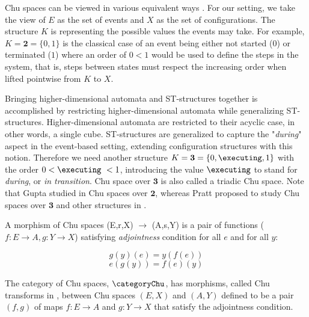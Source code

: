     Chu spaces can be viewed in various equivalent ways \cite[Chapter 5]{gupta94phd_Chu}.  For our setting, we take the view of $E$ as the set of events and $X$ as the set of configurations. The structure $K$ is representing the possible values the events may take. For example, $K= \mathbf{2}= \{0,1\}$ is the classical case of an event being either not started ($0$) or terminated ($1$) where an order of $0 < 1$ would be used to define the steps in the system, that is, steps between states must respect the increasing order when lifted pointwise from $K$ to $X$.
    
    Bringing higher-dimensional automata and ST-structures together is accomplished by restricting higher-dimensional automata while generalizing ST-structures. Higher-dimensional automata are restricted to their acyclic case, in other words, a single cube. ST-structures are generalized to capture the "\emph{during}" aspect in the event-based setting, extending configuration structures with this notion. Therefore we need another structure $K= \mathbf{3}= \{0, \executing , 1\}$ with the order $0 < \executing\ < 1$, introducing the value $\executing$ to stand for \textit{during}, or \textit{in transition}. Chu space over $\mathbf{3}$ is also called a triadic Chu space. Note that Gupta studied in \cite{gupta94phd_Chu} Chu spaces over $\mathbf{2}$, whereas Pratt proposed to study Chu spaces over $\mathbf{3}$ and other structures in \cite{Pratt03trans_cancel}.

    \begin{definition}
        \label{def:morphism_of_Chu_spaces}
        A morphism of Chu spaces (E,r,X) $\rightarrow$ (A,s,Y) is a pair of functions ($f:E \rightarrow A, g:Y \rightarrow X$) satisfying \emph{adjointness} condition for all $e$ and for all $y$:
        
        \begin{equation}
            g(y)(e) = y(f(e))\label{categoryChu1}
        \end{equation} 
        \begin{equation}
            e(g(y)) = f(e)(y)\label{categoryChu2}
        \end{equation} 
    \end{definition}
    
    The category of Chu spaces, $\categoryChu$, has morphisms, called Chu transforms in \cite[Chapter 4]{gupta94phd_Chu}, between Chu spaces $(E,X)$ and $(A,Y)$ defined to be a pair $(f,g)$ of maps $f: E \rightarrow A$ and $g: Y \rightarrow X$ that satisfy the adjointness condition.

